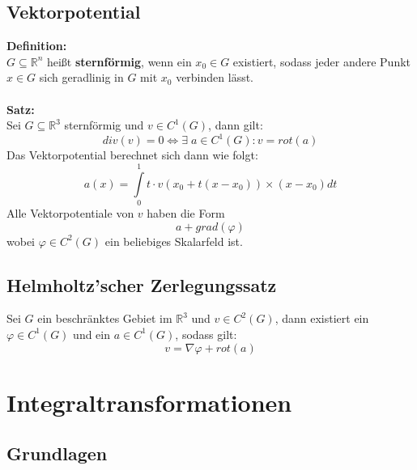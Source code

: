 \documentclass[a4paper,twocolumn,10pt]{article}
\begin{document}
\subsection{Vektorpotential}
\textbf{Definition:}\\
$G\subseteq\mathbb{R}^n$ heißt \textbf{sternförmig}, wenn ein $x_0\in G$ existiert, sodass jeder andere Punkt $x\in G$ sich geradlinig in $G$ mit $x_0$ verbinden lässt.\\\\
\textbf{Satz:}\\
Sei $G\subseteq\mathbb{R}^3$ sternförmig und $v\in C^1(G)$, dann gilt:
\begin{equation*}
div(v)=0\Leftrightarrow \exists\;a\in C^1(G): v=rot(a)
\end{equation*}
Das Vektorpotential berechnet sich dann wie folgt:
\begin{equation*}
a(x)=\int\limits_{0}^{1}t\cdot v(x_0+t(x-x_0))\times (x-x_0)dt
\end{equation*}
Alle Vektorpotentiale von $v$ haben die Form
\begin{equation*}
a+grad(\varphi)
\end{equation*}
wobei $\varphi\in C^2(G)$ ein beliebiges Skalarfeld ist.

\subsection{Helmholtz'scher Zerlegungssatz}
Sei $G$ ein beschränktes Gebiet im $\mathbb{R}^3$ und $v\in C^2(G)$, dann existiert ein $\varphi\in C^1(G)$ und ein $a\in C^1(G)$, sodass gilt:
\begin{equation*}
v=\nabla\varphi+rot(a)
\end{equation*}

\section{Integraltransformationen}

\subsection{Grundlagen}
\end{document}
